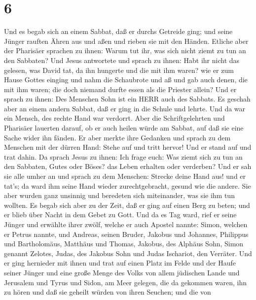 \hypertarget{section-5}{%
\section{6}\label{section-5}}

 Und es begab sich an einem Sabbat, daß er durchs Getreide
ging; und seine Jünger rauften Ähren aus und aßen und rieben sie mit den
Händen.  Etliche aber der Pharisäer sprachen zu ihnen: Warum
tut ihr, was sich nicht ziemt zu tun an den Sabbaten?  Und
Jesus antwortete und sprach zu ihnen: Habt ihr nicht das gelesen, was
David tat, da ihn hungerte und die mit ihm waren?  wie er
zum Hause Gottes einging und nahm die Schaubrote und aß und gab auch
denen, die mit ihm waren; die doch niemand durfte essen als die Priester
allein?  Und er sprach zu ihnen: Des Menschen Sohn ist ein
HERR auch des Sabbats.  Es geschah aber an einem andern
Sabbat, daß er ging in die Schule und lehrte. Und da war ein Mensch, des
rechte Hand war verdorrt.  Aber die Schriftgelehrten und
Pharisäer lauerten darauf, ob er auch heilen würde am Sabbat, auf daß
sie eine Sache wider ihn fänden.  Er aber merkte ihre
Gedanken und sprach zu dem Menschen mit der dürren Hand: Stehe auf und
tritt hervor! Und er stand auf und trat dahin.  Da sprach
Jesus zu ihnen: Ich frage euch: Was ziemt sich zu tun an den Sabbaten,
Gutes oder Böses? das Leben erhalten oder verderben?  Und
er sah sie alle umher an und sprach zu dem Menschen: Strecke deine Hand
aus! und er tat's; da ward ihm seine Hand wieder zurechtgebracht, gesund
wie die andere.  Sie aber wurden ganz unsinnig und
beredeten sich miteinander, was sie ihm tun wollten.  Es
begab sich aber zu der Zeit, daß er ging auf einen Berg zu beten; und er
blieb über Nacht in dem Gebet zu Gott.  Und da es Tag ward,
rief er seine Jünger und erwählte ihrer zwölf, welche er auch Apostel
nannte:  Simon, welchen er Petrus nannte, und Andreas,
seinen Bruder, Jakobus und Johannes, Philippus und Bartholomäus,
 Matthäus und Thomas, Jakobus, des Alphäus Sohn, Simon
genannt Zelotes,  Judas, des Jakobus Sohn und Judas
Ischariot, den Verräter.  Und er ging hernieder mit ihnen
und trat auf einen Platz im Felde und der Haufe seiner Jünger und eine
große Menge des Volks von allem jüdischen Lande und Jerusalem und Tyrus
und Sidon, am Meer gelegen,  die da gekommen waren, ihn zu
hören und daß sie geheilt würden von ihren Seuchen; und die von
